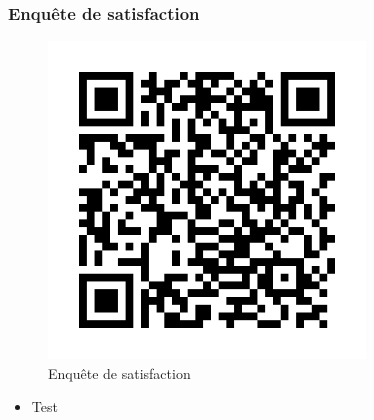 \begin{frame}
    \frametitle{Enquête de satisfaction}
        \begin{figure}[h]
            \centering
            \includegraphics[width=0.75\textwidth]{../img/enquete_satisfaction_2023_Q1.png}
            \caption{Enquête de satisfaction}
        \end{figure}
    \begin{itemize}
        \item Test
    \end{itemize}
\end{frame}